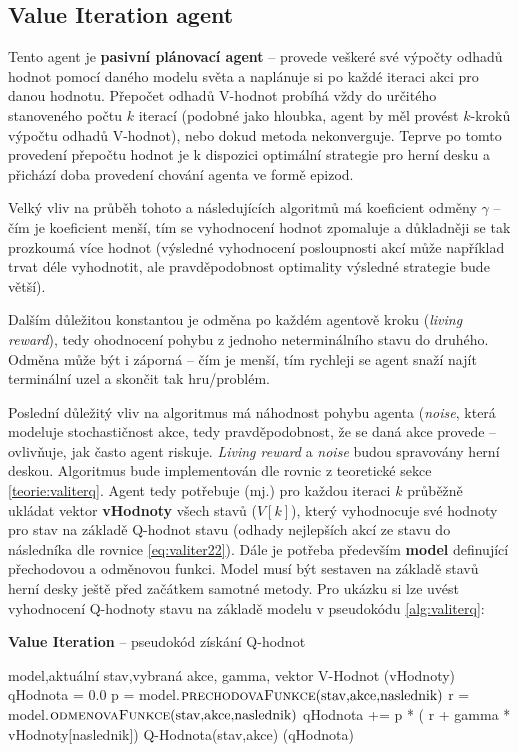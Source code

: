 \subsection*{Value Iteration agent}
\label{navrh:valiteragent}
Tento agent je \textbf{pasivní plánovací agent} -- provede veškeré své výpočty odhadů hodnot pomocí daného modelu světa a naplánuje si po každé iteraci akci pro danou hodnotu. Přepočet odhadů V-hodnot probíhá vždy do určitého stanoveného počtu $k$ iterací (podobné jako hloubka, agent by měl provést $k$-kroků výpočtu odhadů V-hodnot), nebo dokud metoda nekonverguje. Teprve po tomto provedení přepočtu hodnot je k dispozici optimální strategie pro herní desku a přichází doba provedení chování agenta ve formě epizod.

Velký vliv na průběh tohoto a následujících algoritmů má koeficient odměny $\gamma$ -- čím je koeficient menší, tím se vyhodnocení hodnot zpomaluje a důkladněji se tak prozkoumá více hodnot (výsledné vyhodnocení posloupnosti akcí může například trvat déle vyhodnotit, ale pravděpodobnost optimality výsledné strategie bude větší).

Dalším důležitou konstantou je odměna po každém agentově kroku (\textit{living reward}), tedy ohodnocení pohybu z jednoho neterminálního stavu do druhého. Odměna může být i záporná -- čím je menší, tím rychleji se agent snaží najít terminální uzel a skončit tak hru/problém. 

Poslední důležitý vliv na algoritmus má náhodnost pohybu agenta (\textit{noise}, která modeluje stochastičnost akce, tedy pravděpodobnost, že se daná akce provede -- ovlivňuje, jak často agent riskuje. \textit{Living reward} a \textit{noise} budou spravovány herní deskou.
\newline
Algoritmus bude implementován dle rovnic z teoretické sekce \ref{teorie:valiterq}. Agent tedy potřebuje (mj.) pro každou iteraci $k$ průběžně ukládat vektor \textbf{vHodnoty} všech stavů ($V\left[k\right]$), který vyhodnocuje své hodnoty pro stav na základě Q-hodnot stavu (odhady nejlepších akcí ze stavu do následníka dle rovnice \ref{eq:valiter22}). Dále je potřeba především \textbf{model} definující přechodovou a odměnovou funkci. Model musí být sestaven na základě stavů herní desky ještě před začátkem samotné metody. Pro ukázku si lze uvést vyhodnocení Q-hodnoty stavu na základě modelu v pseudokódu \ref{alg:valiterq}:
 
\begin{algorithm}
\caption{\textbf{Value Iteration} -- pseudokód získání Q-hodnot}
\label{alg:valiterq}
\begin{algorithmic}[1]
\Require model,aktuální stav,vybraná akce, gamma, vektor V-Hodnot (vHodnoty)
\State qHodnota = 0.0
  \State p = model.$\text{\Call{prechodovaFunkce}{stav,akce,naslednik}}$
  \State r = model.$\text{\Call{odmenovaFunkce}{stav,akce,naslednik}}$
  \State qHodnota += p * ( r + gamma * vHodnoty[naslednik])
\EndFor
\Ensure Q-Hodnota(stav,akce) (qHodnota)
\end{algorithmic}
\end{algorithm}
\newpage

